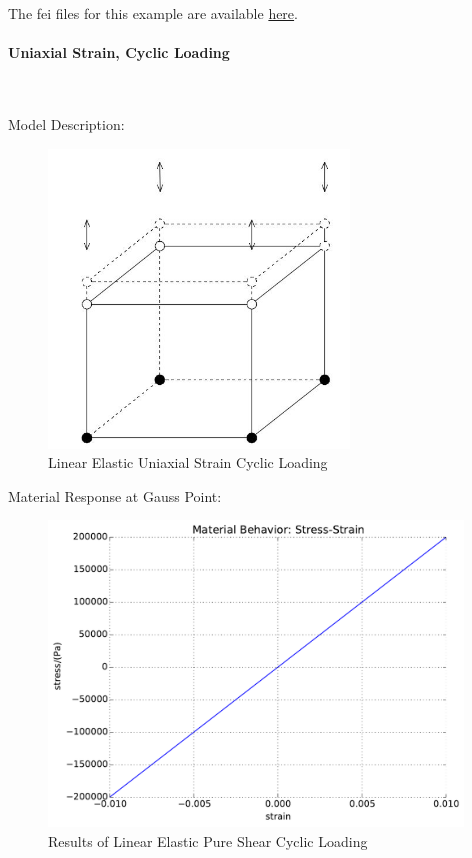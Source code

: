 \documentclass[fleqn,11pt]{article}
\begin{document}
The fei files for this example are available \href{https://github.com/yuan-energy/education_examples/tree/master/fei_examples/linear_elastic_solid/3uniaxial_strain_mono_loading}{here}.


\newpage
\paragraph{Uniaxial Strain, Cyclic Loading} ~

Model Description:

\begin{figure}[H]
\begin{center}
\includegraphics[width=8cm]{../Figure-files/vertical_cyclic.JPG}
\caption{
\label{Linear Elastic Uniaxial Strain Cyclic Loadin}
Linear Elastic Uniaxial Strain Cyclic Loading}
\end{center}
\end{figure}

Material Response at Gauss Point:

\begin{figure}[H]
\begin{center}
\includegraphics[width=11cm]{../fei_examples/linear_elastic_solid/4uniaxial_strain_cyclic_loading/result.pdf}
\caption{
\label{Results_Linear Elastic Pure Shear Cyclic Loadin}
Results of Linear Elastic Pure Shear Cyclic Loading}
\end{center}
\end{figure}
\end{document}
